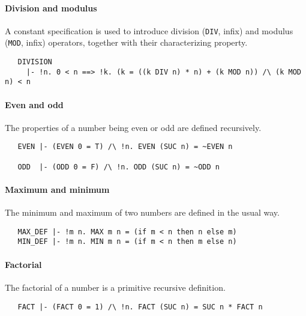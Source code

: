 \paragraph{Division and modulus}

A constant specification is used to introduce division ({\small\verb+DIV+}, infix) and
modulus ({\small\verb+MOD+}, infix) operators, together with their
characterizing property.
\begin{hol}
{\small
\begin{verbatim}
   DIVISION
     |- !n. 0 < n ==> !k. (k = ((k DIV n) * n) + (k MOD n)) /\ (k MOD n) < n
\end{verbatim}
}
\end{hol}

\paragraph{Even and odd}

The properties of a number being even or odd are defined recursively.
%
\begin{hol}
{\small
\begin{verbatim}
   EVEN |- (EVEN 0 = T) /\ !n. EVEN (SUC n) = ~EVEN n

   ODD  |- (ODD 0 = F) /\ !n. ODD (SUC n) = ~ODD n
\end{verbatim}
}
\end{hol}

\paragraph{Maximum and minimum}

The minimum and maximum of two numbers are defined in the usual way.
%
\begin{hol}
{\small
\begin{verbatim}
   MAX_DEF |- !m n. MAX m n = (if m < n then n else m)
   MIN_DEF |- !m n. MIN m n = (if m < n then m else n)
\end{verbatim}
}
\end{hol}

\paragraph{Factorial}

The factorial of a number is a primitive recursive definition.
%
\begin{hol}
{\small
\begin{verbatim}
   FACT |- (FACT 0 = 1) /\ !n. FACT (SUC n) = SUC n * FACT n
\end{verbatim}
}
\end{hol}

